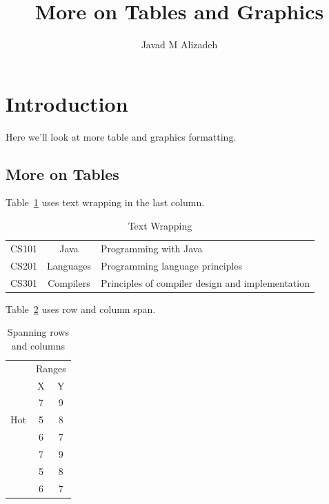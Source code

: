 \documentclass{proc}
\title{More on Tables and Graphics}
\author{Javad M Alizadeh}
\date{}
\begin{document}
\maketitle
	
\section{Introduction}

Here we'll look at more table and graphics formatting.


\subsection{More on Tables}

Table~\ref{tab:wrapping} uses text wrapping in the last column.

\begin{table}[htbp]
	\caption{Text Wrapping}
	\begin{center}
		\begin{tabular}{|c|c|p{3cm}|}
			\hline
			CS101 & Java & Programming with Java \\
			CS201 & Languages & Programming language principles \\
			CS301 & Compilers & Principles of compiler design and implementation \\
			\hline
		\end{tabular}
	\end{center}
\label{tab:wrapping}	
\end{table}

Table~\ref{tab:multi} uses row and column span.

\begin{table}[htbp]
	\caption{Spanning rows and columns}
	\begin{center}
		\begin{tabular}{|c|c|c|}
			\hline
			& \multicolumn{2}{c|}{Ranges} \\
			\cline{2-3}
			& X & Y \\
			\hline
			\multirow{3}{*}{Hot} & 7 & 9 \\
			& 5 & 8 \\
			& 6 & 7 \\\hdashline 
			\multirow{3}{*}{Cold} & 7 & 9 \\
			& 5 & 8 \\
			& 6 & 7 \\
			\hline
		\end{tabular}
	\end{center}
	\label{tab:multi}	
\end{table}
	
\end{document}
